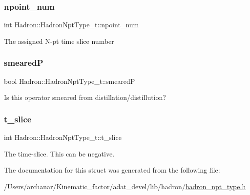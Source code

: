 \subsubsection{\texorpdfstring{npoint\_num}{npoint\_num}}
{\footnotesize\ttfamily int Hadron\+::\+Hadron\+Npt\+Type\+\_\+t\+::npoint\+\_\+num}

The assigned N-\/pt time slice number \mbox{\label{structHadron_1_1HadronNptType__t_ae339f43ad2a511982ecb2cf581982af6}} 
\subsubsection{\texorpdfstring{smearedP}{smearedP}}
{\footnotesize\ttfamily bool Hadron\+::\+Hadron\+Npt\+Type\+\_\+t\+::smearedP}

Is this operator smeared from distillation/distillution? \mbox{\label{structHadron_1_1HadronNptType__t_a9525dc3ea9b4e2a1ec8f9ca1c1eb275c}} 
\subsubsection{\texorpdfstring{t\_slice}{t\_slice}}
{\footnotesize\ttfamily int Hadron\+::\+Hadron\+Npt\+Type\+\_\+t\+::t\+\_\+slice}

The time-\/slice. This can be negative. 

The documentation for this struct was generated from the following file\+:\begin{DoxyCompactItemize}
\item 
/\+Users/archanar/\+Kinematic\+\_\+factor/adat\+\_\+devel/lib/hadron/\mbox{\hyperlink{lib_2hadron_2hadron__npt__type_8h}{hadron\+\_\+npt\+\_\+type.\+h}}\end{DoxyCompactItemize}

